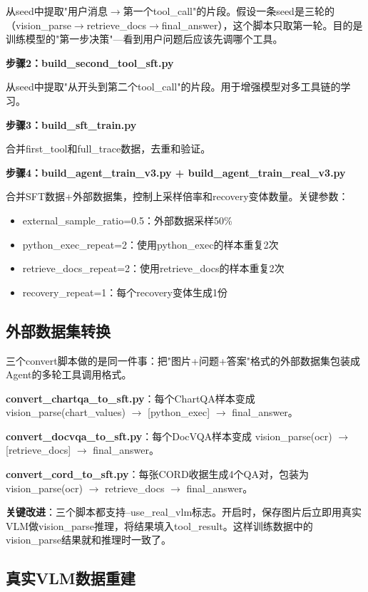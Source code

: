 \documentclass[fontset=none,11pt,a4paper]{ctexart}
\begin{document}
从seed中提取"用户消息$\to$第一个tool\_call"的片段。假设一条seed是三轮的（vision\_parse$\to$retrieve\_docs$\to$final\_answer），这个脚本只取第一轮。目的是训练模型的"第一步决策"---看到用户问题后应该先调哪个工具。

\textbf{步骤2：build\_second\_tool\_sft.py}

从seed中提取"从开头到第二个tool\_call"的片段。用于增强模型对多工具链的学习。

\textbf{步骤3：build\_sft\_train.py}

合并first\_tool和full\_trace数据，去重和验证。

\textbf{步骤4：build\_agent\_train\_v3.py + build\_agent\_train\_real\_v3.py}

合并SFT数据+外部数据集，控制上采样倍率和recovery变体数量。关键参数：
\begin{itemize}[nosep]
    \item external\_sample\_ratio=0.5：外部数据采样50\%
    \item python\_exec\_repeat=2：使用python\_exec的样本重复2次
    \item retrieve\_docs\_repeat=2：使用retrieve\_docs的样本重复2次
    \item recovery\_repeat=1：每个recovery变体生成1份
\end{itemize}

\subsection{外部数据集转换}

三个convert脚本做的是同一件事：把"图片+问题+答案"格式的外部数据集包装成Agent的多轮工具调用格式。

\textbf{convert\_chartqa\_to\_sft.py}：每个ChartQA样本变成 vision\_parse(chart\_values) $\to$ [python\_exec] $\to$ final\_answer。

\textbf{convert\_docvqa\_to\_sft.py}：每个DocVQA样本变成 vision\_parse(ocr) $\to$ [retrieve\_docs] $\to$ final\_answer。

\textbf{convert\_cord\_to\_sft.py}：每张CORD收据生成4个QA对，包装为 vision\_parse(ocr) $\to$ retrieve\_docs $\to$ final\_answer。

\textbf{关键改进}：三个脚本都支持--use\_real\_vlm标志。开启时，保存图片后立即用真实VLM做vision\_parse推理，将结果填入tool\_result。这样训练数据中的vision\_parse结果就和推理时一致了。

\subsection{真实VLM数据重建}
\end{document}
